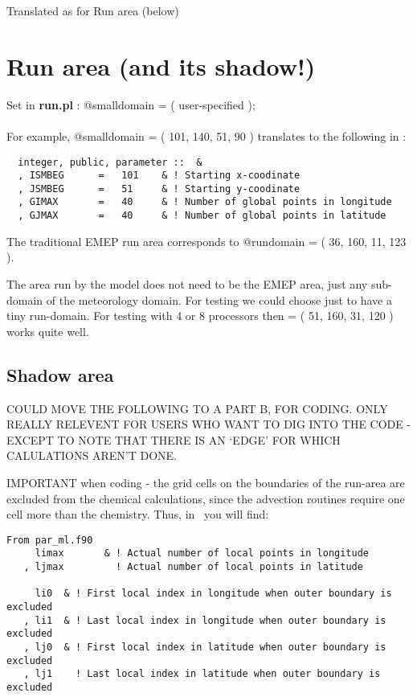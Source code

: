 Translated as for Run area (below)

\section{ Run area  (and its shadow!) } 

\noindent
Set in {\bf run.pl} : @smalldomain = ( user-specified  );  \\
\vspace{3mm}
\\
For example, @smalldomain = ( 101, 140, 51, 90 ) 
translates to the following in \Par:\\
\begin{small}\begin{verbatim}
  integer, public, parameter ::  &
  , ISMBEG      =   101    & ! Starting x-coodinate
  , JSMBEG      =   51     & ! Starting y-coodinate
  , GIMAX       =   40     & ! Number of global points in longitude
  , GJMAX       =   40     & ! Number of global points in latitude
\end{verbatim}
\end{small}

The traditional EMEP run area corresponds to  @rundomain = ( 36, 160, 11, 123 ).


The area run by the model does not need to be the EMEP area, just
any sub-domain of the meteorology domain. For testing we could choose just to
have a tiny run-domain. For testing with 4 or 8 processors then
\@smalldomain = ( 51, 160, 31, 120 ) works quite well.



\subsection*{Shadow area}

COULD MOVE THE FOLLOWING TO A PART B, FOR CODING. ONLY REALLY RELEVENT
FOR USERS WHO WANT TO DIG  INTO THE CODE - EXCEPT TO NOTE THAT THERE
IS AN `EDGE' FOR WHICH CALULATIONS AREN'T DONE.

IMPORTANT when coding - the grid cells on the boundaries of the run-area are
excluded from the chemical calculations, since the advection routines
require one cell more than the chemistry. Thus, in \Par\ you will find:

\begin{small}\begin{verbatim}
From par_ml.f90
     limax       & ! Actual number of local points in longitude
   , ljmax         ! Actual number of local points in latitude

     li0  & ! First local index in longitude when outer boundary is excluded
   , li1  & ! Last local index in longitude when outer boundary is excluded
   , lj0  & ! First local index in latitude when outer boundary is excluded
   , lj1    ! Last local index in latitude when outer boundary is excluded
\end{verbatim}
\end{small}


